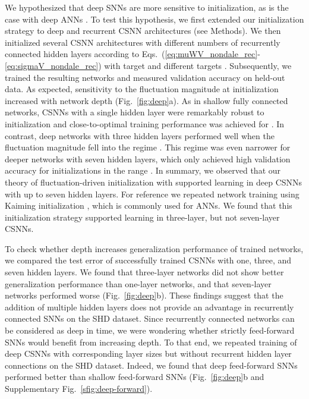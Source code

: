 \documentclass[11pt,a4paper]{article}
\begin{document}
We hypothesized that deep \acp{SNN} are more sensitive to initialization, as is the case with deep \acp{ANN} \citep{He2015-kv}. 
To test this hypothesis, we first extended our initialization strategy to deep and recurrent \ac{CSNN} architectures (see Methods).
We then initialized several \ac{CSNN} architectures with different numbers of recurrently connected hidden layers according to \mbox{Eqs.~(\ref{eq:muWV_nondale_rec}-\ref{eq:sigmaV_nondale_rec})} with target  and different targets .
Subsequently, we trained the resulting networks and measured validation accuracy on held-out data.
As expected, sensitivity to the fluctuation magnitude at initialization increased with network depth (Fig.~\ref{fig:deep}a). 
As in shallow fully connected networks, \acp{CSNN} with a single hidden layer were remarkably robust to initialization and close-to-optimal training performance was achieved for . 
In contrast, deep networks with three hidden layers performed well when the fluctuation magnitude fell into the regime \mbox{}. 
This regime was even narrower for deeper networks with seven hidden layers, which only achieved high validation accuracy for initializations in the range .
In summary, we observed that our theory of fluctuation-driven initialization with  supported learning in deep \acp{CSNN} with up to seven hidden layers. 
For reference we repeated network training using Kaiming initialization \cite{He2015-kv}, which is commonly used for \acp{ANN}.
We found that this initialization strategy supported learning in three-layer, but not seven-layer \acp{CSNN}.

To check whether depth increases generalization performance of trained networks, we compared the test error of successfully trained \acp{CSNN} with one, three, and seven hidden layers.
We found that three-layer networks did not show better generalization performance than one-layer networks, and that seven-layer networks performed worse (Fig.~\ref{fig:deep}b).
These findings suggest that the addition of multiple hidden layers does not provide an advantage in recurrently connected \acp{SNN} on the SHD dataset.
Since recurrently connected networks can be considered as deep in time, we were wondering whether strictly feed-forward  \acp{SNN} would benefit from increasing depth.
To that end, we repeated training of deep \acp{CSNN} with corresponding layer sizes but without recurrent hidden layer connections on the SHD dataset.
Indeed, we found that deep feed-forward \acp{SNN} performed better than shallow feed-forward \acp{SNN} (Fig.~\ref{fig:deep}b and Supplementary Fig.~\ref{sfig:deep-forward}).
\end{document}
